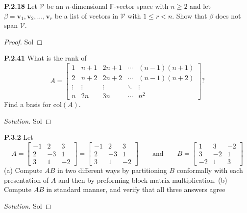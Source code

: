 \documentclass[12pt]{amsart}
\newenvironment{solution}
{\begin{proof}[Solution]}
{\end{proof}}
\begin{document}
\begin{onehalfspace}
        \noindent\textbf{P.2.18} Let $\mathcal{V}$ be an $n$-dimensional $\mathbb{F}$-vector space with $n\ge 2$ and let
        $\beta = \mathbf{v}_1, \mathbf{v}_2, \ldots, \mathbf{v}_r$ be a list of vectors in $\mathcal{V}$ with
        $1\le r< n$.
        Show that $\beta$ does not span $\mathcal{V}$.
        \begin{proof}
            Sol
        \end{proof}

        \noindent\textbf{P.2.41} What is the rank of
        \begin{displaymath}
            A = \left[\begin{matrix}
                          1 & n+1 & 2n+1 & \cdots & (n-1)(n+1)\\
                          2 & n+2 & 2n+2 & \cdots & (n-1)(n+2)\\
                          \vdots & \vdots & \vdots & \ddots & \vdots\\
                          n & 2n & 3n & \cdots & n^2
            \end{matrix}\right]?
        \end{displaymath}
        Find a basis for $\text{col}(A)$.
        \begin{solution}
            Sol
        \end{solution}

        \noindent\textbf{P.3.2} Let
        \begin{displaymath}
            A = \left[\begin{array}{c|cc}
                          -1 & 2 & 3\\
                          \hline
                          2 & -3 & 1\\
                          3 & 1 & -2
            \end{array}\right] =
            \left[\begin{array}{cc|c}
                          -1 & 2 & 3\\
                          \hline
                          2 & -3 & 1\\
                          3 & 1 & -2
            \end{array}\right]
            \qquad\text{and}\qquad
            B = \left[\begin{matrix}
                          1 & 3 & -2\\
                          3 & -2 & 1\\
                          -2 & 1 & 3
            \end{matrix}\right]
        \end{displaymath}
        (a) Compute $AB$ in two different ways by partitioning $B$ conformally with each presentation of $A$ and then
        by preforming block matrix multiplication.
        (b) Compute $AB$ in standard manner, and verify that all three answers agree
        \begin{solution}
            Sol
        \end{solution}


\end{onehalfspace}
\end{document}
